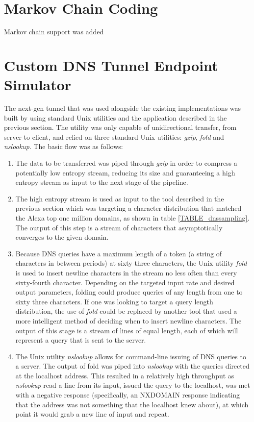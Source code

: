 \documentclass[12pt]{report}
\theoremstyle{remark}
\theoremstyle{definition}
\theoremstyle{definition}
\theoremstyle{definition}
\begin{document}
\begin{appendices}
\section{Markov Chain Coding}

Markov chain support was added 

\section{Custom DNS Tunnel Endpoint Simulator}
\label{appendix-customdns}

The next-gen tunnel that was used alongside the existing implementations was
built by using standard Unix utilities and the application described in the
previous section. The utility was only capable of unidirectional transfer, from
server to client, and relied on three standard Unix utilities: \emph{gzip},
\emph{fold} and \emph{nslookup}. The basic flow was as follows:

\begin{enumerate} \item The data to be transferred was piped through \emph{gzip}
in order to compress a potentially low entropy stream, reducing its size and
guaranteeing a high entropy stream as input to the next stage of the pipeline.

\item The high entropy stream is used as input to the tool described in the
previous section which was targeting a character distribution that matched the
Alexa top one million domains, as shown in table \ref{TABLE_dnssampling}. The
output of this step is a stream of characters that asymptotically converges to
the given domain.

\item Because DNS queries have a maximum length of a token (a string of
characters in between periods) at sixty three characters, the Unix utility
\emph{fold} is used to insert newline characters in the stream no less often
than every sixty-fourth character. Depending on the targeted input rate and
desired output parameters, folding could produce queries of any length from one
to sixty three characters. If one was looking to target a query length
distribution, the use of \emph{fold} could be replaced by another tool that used
a more intelligent method of deciding when to insert newline characters. The
output of this stage is a stream of lines of equal length, each of which will
represent a query that is sent to the server.

\item The Unix utility \emph{nslookup} allows for command-line issuing of DNS
queries to a server. The output of fold was piped into \emph{nslookup} with the
queries directed at the localhost address. This resulted in a relatively high
throughput as \emph{nslookup} read a line from its input, issued the query to
the localhost, was met with a negative response (specifically, an NXDOMAIN
response indicating that the address was not something that the localhost knew
about), at which point it would grab a new line of input and repeat.
\end{enumerate}


\end{appendices}
\end{document}
